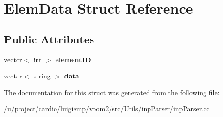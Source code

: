 \hypertarget{struct_elem_data}{
\section{ElemData Struct Reference}
\label{struct_elem_data}
}
\subsection*{Public Attributes}
\begin{DoxyCompactItemize}
\item 
\hypertarget{struct_elem_data_ae78d3b406ae14e787d8619fb534d4f84}{
vector$<$ int $>$ {\bfseries elementID}}
\label{struct_elem_data_ae78d3b406ae14e787d8619fb534d4f84}

\item 
\hypertarget{struct_elem_data_ae3ce70b8de33840dd0f1346bc8b5e19d}{
vector$<$ string $>$ {\bfseries data}}
\label{struct_elem_data_ae3ce70b8de33840dd0f1346bc8b5e19d}

\end{DoxyCompactItemize}


The documentation for this struct was generated from the following file:\begin{DoxyCompactItemize}
\item 
/u/project/cardio/luigiemp/voom2/src/Utils/inpParser/inpParser.cc\end{DoxyCompactItemize}
